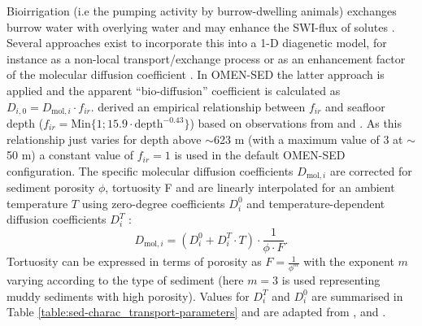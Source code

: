 \documentclass[gmd, manuscript]{copernicus}
\begin{document}
Bioirrigation (i.e the pumping activity by burrow-dwelling animals) exchanges burrow water with overlying water and may enhance the SWI-flux of solutes \citep{aller_importance_1984, aller1988benthic}. 
Several approaches exist to incorporate this into a 1-D diagenetic model, for instance as a non-local transport/exchange process \citep{boudreau_equivalence_1984, emerson_sediment-water_1984} 
or as an enhancement factor of the molecular diffusion coefficient \citep{devol_benthic_1993, soetaert_model_1996}. In OMEN-SED the latter approach is applied and the 
apparent ``bio-diffusion'' coefficient is calculated as $D_{i,0}=D_{\mathrm{mol},i}\cdot f_{ir}$. 
\citet{soetaert_model_1996} derived an empirical relationship between $f_{ir}$ and seafloor depth ($f_{ir} = \mathrm{Min}\{1; 15.9\cdot \mathrm{depth}^{-0.43}\}$) 
based on observations from \citet{archer_benthic_1992} and \citet{devol_benthic_1993}. As this relationship just varies for depth above $\sim$623 m (with a maximum 
value of 3 at $\sim$50 m) a constant value of $f_{ir}=1$ is used in the default OMEN-SED configuration. 
The specific molecular diffusion coefficients $D_{\mathrm{mol},i}$ are corrected for sediment porosity $\phi$, tortuosity F and are linearly interpolated for an ambient 
temperature $T$ using zero-degree coefficients $D^0_i$ and temperature-dependent diffusion coefficients $D^T_i$ \citep[][]{soetaert_model_1996}:
\begin{equation*}
 D_{\mathrm{mol},i} = (D^0_i + D^T_i \cdot T )\cdot \frac{1}{\phi\cdot F}.
\end{equation*}
Tortuosity can be expressed in terms of porosity as $F = \frac{1}{\phi^m}$ \citep{ullman_diffusion_1982} with the exponent $m$ varying according to the type of sediment (here $m=3$ is used representing muddy sediments with high porosity). 
Values for $D^T_i$ and $D^0_i$ are summarised in Table \ref{table:sed-charac_transport-parameters} and are adapted from \citet{Li_diffusion_1974}, \citet{schulz_quantification_2006} and \citet{gypens_simple_2008}.
\end{document}
